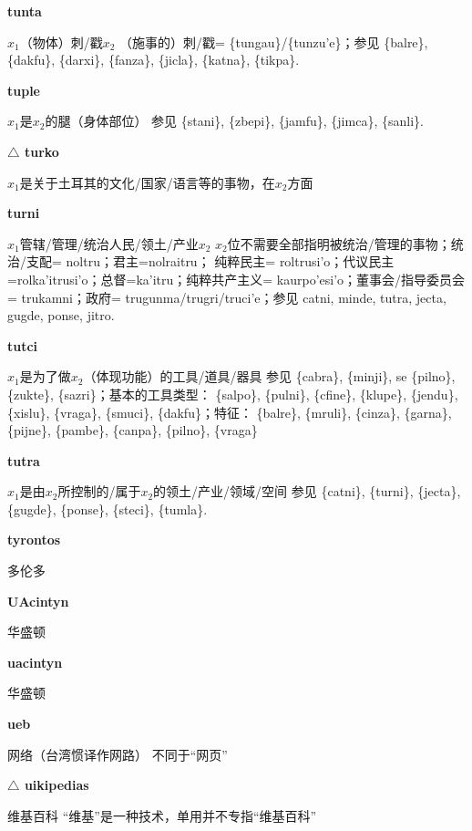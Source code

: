 \documentclass[notitlepage,twocolumn,a4paper,10pt]{book}
\begin{document}
{\sffamily\bfseries tunta}\enspace {\ttfamily\bfseries[tun]}  $x_1$（物体）刺\slash{}戳$x_2$ \textemdash{} （施事的）刺\slash{}戳= \{tungau\}\slash{}\{tunzu'e\}；参见 \{balre\}, \{dakfu\}, \{darxi\}, \{fanza\}, \{jicla\}, \{katna\}, \{tikpa\}.

{\sffamily\bfseries tuple}\enspace {\ttfamily\bfseries[tup     tu'e]}  $x_1$是$x_2$的腿（身体部位） \textemdash{} 参见 \{stani\}, \{zbepi\}, \{jamfu\}, \{jimca\}, \{sanli\}.

{\sffamily\bfseries $\triangle$ turko} $x_1$是关于土耳其的文化\slash{}国家\slash{}语言等的事物，在$x_2$方面

{\sffamily\bfseries turni}\enspace {\ttfamily\bfseries[    tru]}  $x_1$管辖\slash{}管理\slash{}统治人民\slash{}领土\slash{}产业$x_2$ \textemdash{} $x_2$位不需要全部指明被统治\slash{}管理的事物；统治\slash{}支配= {noltru}；君主={nolraitru}； 纯粹民主= {roltrusi'o}；代议民主={rolka'itrusi'o}；总督={ka'itru}；纯粹共产主义= {kaurpo'esi'o}；董事会\slash{}指导委员会= {trukamni}；政府= {trugunma}\slash{}{trugri}\slash{}{truci'e}；参见 {catni}, {minde}, {tutra}, {jecta}, {gugde}, {ponse}, {jitro}.

{\sffamily\bfseries tutci}\enspace {\ttfamily\bfseries[    tci]}  $x_1$是为了做$x_2$（体现功能）的工具\slash{}道具\slash{}器具 \textemdash{} 参见 \{cabra\}, \{minji\}, se \{pilno\}, \{zukte\}, \{sazri\}；基本的工具类型： \{salpo\}, \{pulni\}, \{cfine\}, \{klupe\}, \{jendu\}, \{xislu\}, \{vraga\}, \{smuci\}, \{dakfu\}；特征： \{balre\}, \{mruli\}, \{cinza\}, \{garna\}, \{pijne\}, \{pambe\}, \{canpa\}, \{pilno\}, \{vraga\}

{\sffamily\bfseries tutra}\enspace {\ttfamily\bfseries[tut]}  $x_1$是由$x_2$所控制的\slash{}属于$x_2$的领土\slash{}产业\slash{}领域\slash{}空间 \textemdash{} 参见 \{catni\}, \{turni\}, \{jecta\}, \{gugde\}, \{ponse\}, \{steci\}, \{tumla\}.

{\sffamily\bfseries tyrontos} 多伦多

{\sffamily\bfseries UAcintyn} 华盛顿

{\sffamily\bfseries uacintyn} 华盛顿

{\sffamily\bfseries ueb} 网络（台湾惯译作网路） \textemdash{} 不同于“网页”

{\sffamily\bfseries $\triangle$ uikipedias} 维基百科 \textemdash{} “维基”是一种技术，单用并不专指“维基百科”
\end{document}
